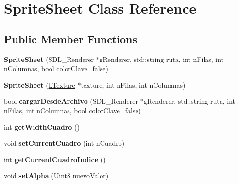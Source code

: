 \hypertarget{class_sprite_sheet}{}\section{Sprite\+Sheet Class Reference}
\label{class_sprite_sheet}
\subsection*{Public Member Functions}
\begin{DoxyCompactItemize}
\item 
{\bfseries Sprite\+Sheet} (S\+D\+L\+\_\+\+Renderer $\ast$g\+Renderer, std\+::string ruta, int n\+Filas, int n\+Columnas, bool color\+Clave=false)\hypertarget{class_sprite_sheet_ad6b04a5b43dd7ad57895a9f28cb5ac49}{}\label{class_sprite_sheet_ad6b04a5b43dd7ad57895a9f28cb5ac49}

\item 
{\bfseries Sprite\+Sheet} (\hyperlink{class_l_texture}{L\+Texture} $\ast$texture, int n\+Filas, int n\+Columnas)\hypertarget{class_sprite_sheet_a8ea8d8f545ca5d812edf46fa326f00d5}{}\label{class_sprite_sheet_a8ea8d8f545ca5d812edf46fa326f00d5}

\item 
bool {\bfseries cargar\+Desde\+Archivo} (S\+D\+L\+\_\+\+Renderer $\ast$g\+Renderer, std\+::string ruta, int n\+Filas, int n\+Columnas, bool color\+Clave=false)\hypertarget{class_sprite_sheet_a86ee75d55b69a7b5aff33c0207fcfdd0}{}\label{class_sprite_sheet_a86ee75d55b69a7b5aff33c0207fcfdd0}

\item 
int {\bfseries get\+Width\+Cuadro} ()\hypertarget{class_sprite_sheet_a3701ff0240b1c46e8d56ecd6cd7ca301}{}\label{class_sprite_sheet_a3701ff0240b1c46e8d56ecd6cd7ca301}

\item 
void {\bfseries set\+Current\+Cuadro} (int n\+Cuadro)\hypertarget{class_sprite_sheet_a03f5b0cd1337564ec59067766bca3e54}{}\label{class_sprite_sheet_a03f5b0cd1337564ec59067766bca3e54}

\item 
int {\bfseries get\+Current\+Cuadro\+Indice} ()\hypertarget{class_sprite_sheet_afd14baf14301574675150e9c72c5c192}{}\label{class_sprite_sheet_afd14baf14301574675150e9c72c5c192}

\item 
void {\bfseries set\+Alpha} (Uint8 nuevo\+Valor)\hypertarget{class_sprite_sheet_af1faf26008f1dfda33bcf6211c6a9dfa}{}\label{class_sprite_sheet_af1faf26008f1dfda33bcf6211c6a9dfa}


\end{DoxyCompactItemize}
